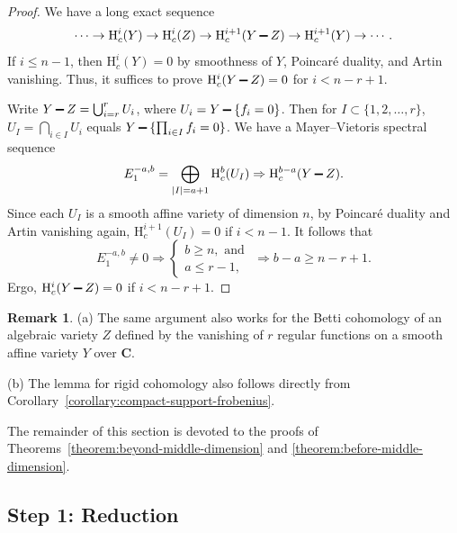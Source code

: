 \documentclass{amsart}
\numberwithin{equation}{section}
\theoremstyle{plain}
\theoremstyle{definition}
\newtheorem{remark}[equation]{Remark}
\renewcommand{\mathbb}{\mathbf}
\renewcommand{\setminus}{\mathbin{\rule[0.2em]{0.67em}{0.12em}}}%
\begin{document}
\begin{proof}
  We have a long exact sequence
  \begin{equation*}
    \cdots \to \mathrm{H}^{i}_c(Y)
    \to \mathrm{H}^{i}_c(Z) \to \mathrm{H}^{i+1}_c(Y\setminus Z)
    \to \mathrm{H}^{i+1}_{c}(Y) \to \cdots.
  \end{equation*}
  If \(i \leq n-1\), then
  \(\mathrm{H}^{i}_{c}(Y)=0\) by
  smoothness of \(Y\), Poincaré duality, and Artin vanishing.
  Thus, it suffices to prove
  \(\mathrm{H}^{i}_{c}(Y\setminus Z)=0\) for \(i<n-r+1\).

  Write \(Y \setminus Z = \bigcup_{i=r}^{r} U_{i}\),
  where \(U_i = Y\setminus \{f_i=0\}\).
  Then for \(I\subset \{1,2,\ldots,r\}\),
  \(U_{I}=\bigcap_{i\in I}U_{i}\) equals \(Y\setminus\{\prod_{i\in I}f_{i}=0\}\).
  We have a Mayer--Vietoris spectral sequence
  \begin{equation*}
    E_{1}^{-a,b} = \bigoplus_{|I|=a+1}\mathrm{H}_{c}^{b}(U_{I})
    \Rightarrow \mathrm{H}^{b-a}_c(Y\setminus Z).
  \end{equation*}
  Since each \(U_{I}\) is a smooth affine variety of dimension \(n\),
  by Poincaré duality and Artin vanishing again,
  \(\mathrm{H}^{i+1}_c(U_{I}) = 0\) if \(i < n-1\).
  It follows that
  \begin{equation*}
    E^{-a,b}_{1} \neq 0 \Longrightarrow
    \begin{cases}
      b \geq n, \text{ and }\\
      a \leq r-1,
    \end{cases} \Longrightarrow b-a\geq n-r+1.
  \end{equation*}
  Ergo, \(\mathrm{H}^{i}_{c}(Y\setminus Z)=0\)
  if \(i < n-r+1\).
\end{proof}

\begin{remark}
  (a) The same argument also works for the Betti cohomology of an algebraic
  variety \(Z\) defined by the vanishing of \(r\) regular functions on a smooth
  affine variety \(Y\) over \(\mathbb{C}\).

  (b) The lemma for rigid cohomology also follows directly from
  Corollary~\ref{corollary:compact-support-frobenius}.
\end{remark}

\medskip
The remainder of this section is devoted to the proofs of
Theorems~\ref{theorem:beyond-middle-dimension} and
\ref{theorem:before-middle-dimension}.

\subsection*{Step 1: Reduction}
\end{document}
